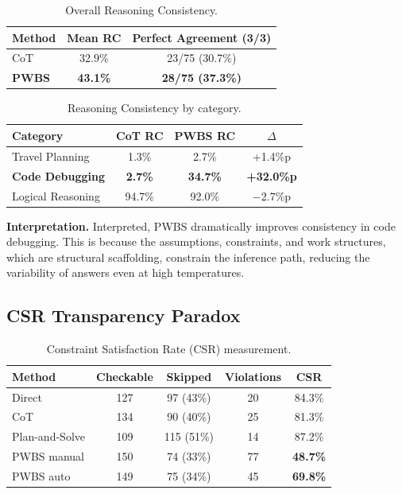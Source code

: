 \documentclass[11pt,a4paper]{article}
\begin{document}
\begin{table}[h]
\centering
\caption{Overall Reasoning Consistency.}
\label{tab:rc}
\begin{tabular}{lcc}
\toprule
\textbf{Method} & \textbf{Mean RC} & \textbf{Perfect Agreement (3/3)} \\
\midrule
CoT & 32.9\% & 23/75 (30.7\%) \\
\textbf{PWBS} & \textbf{43.1\%} & \textbf{28/75 (37.3\%)} \\
\bottomrule
\end{tabular}
\end{table}

\begin{table}[h]
\centering
\caption{Reasoning Consistency by category.}
\label{tab:rc-category}
\begin{tabular}{lccc}
\toprule
\textbf{Category} & \textbf{CoT RC} & \textbf{PWBS RC} & \textbf{$\Delta$} \\
\midrule
Travel Planning & 1.3\% & 2.7\% & +1.4\%p \\
\textbf{Code Debugging} & \textbf{2.7\%} & \textbf{34.7\%} & \textbf{+32.0\%p} \\
Logical Reasoning & 94.7\% & 92.0\% & $-$2.7\%p \\
\bottomrule
\end{tabular}
\end{table}

\textbf{Interpretation.} Interpreted, PWBS dramatically improves consistency in code debugging. This is because the assumptions, constraints, and work structures, which are structural scaffolding, constrain the inference path, reducing the variability of answers even at high temperatures.

\subsection{CSR Transparency Paradox}

\begin{table}[h]
\centering
\caption{Constraint Satisfaction Rate (CSR) measurement.}
\label{tab:csr}
\begin{tabular}{lcccc}
\toprule
\textbf{Method} & \textbf{Checkable} & \textbf{Skipped} & \textbf{Violations} & \textbf{CSR} \\
\midrule
Direct & 127 & 97 (43\%) & 20 & 84.3\% \\
CoT & 134 & 90 (40\%) & 25 & 81.3\% \\
Plan-and-Solve & 109 & 115 (51\%) & 14 & 87.2\% \\
PWBS manual & 150 & 74 (33\%) & 77 & \textbf{48.7\%} \\
PWBS auto & 149 & 75 (34\%) & 45 & \textbf{69.8\%} \\
\bottomrule
\end{tabular}
\end{table}
\end{document}
